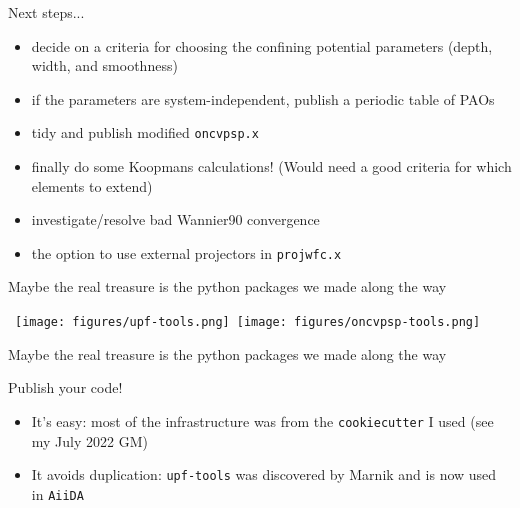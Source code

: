 \documentclass[xcolor=table,aspectratio=169]{beamer}
\numberwithin{equation}{section}
\begin{document}
\begin{frame}{Next steps...}
   \begin{itemize}[<+(1)->]
      \item decide on a criteria for choosing the confining potential parameters (depth, width, and smoothness)
      \item if the parameters are system-independent, publish a periodic table of PAOs
      \item tidy and publish modified \texttt{oncvpsp.x}
      \item finally do some Koopmans calculations! (Would need a good criteria for which elements to extend)
   \end{itemize}

   \begin{itemize}[<+(2)->]
      \item investigate/resolve bad Wannier90 convergence
      \item the option to use external projectors in \texttt{projwfc.x}
   \end{itemize}

\end{frame}

\begin{frame}{\footnotesize Maybe the real treasure is the python packages we made along the way}

   \hbox{
      \texttt{[image: figures/upf-tools.png]}
      \texttt{[image: figures/oncvpsp-tools.png]}
   }
\end{frame}

\begin{frame}{\footnotesize Maybe the real treasure is the python packages we made along the way}

   Publish your code!
   \begin{itemize}
      \item It's easy: most of the infrastructure was from the \texttt{cookiecutter} I used (see my July 2022 GM)
      \item It avoids duplication: \texttt{upf-tools} was discovered by Marnik and is now used in \texttt{AiiDA}
   \end{itemize}

\end{frame}
\end{document}
